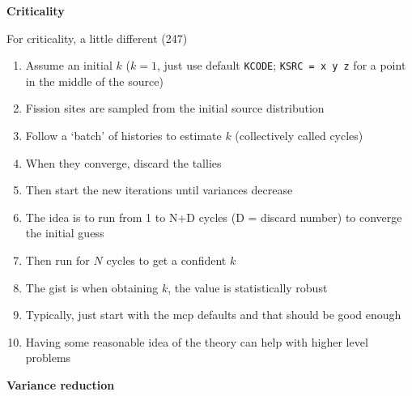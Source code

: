 \documentclass[aspectratio=1610,pdftex,dvipsnames,compress,xcolor={dvipsnames}]{beamer}
\newcommand{\acs}{\acrshort} %
\begin{document}
\begin{frame}[plain]{}
    \centering\LARGE\textbf{Criticality}
\end{frame}


\addtocounter{framenumber}{-1} 
\begin{frame}{For criticality, a little different (247)}
    \begin{enumerate}[series=outerlist,topsep=0pt,itemsep=5pt,leftmargin=*,label=(\arabic*)]
        \item[]Assume an initial $k$ ($k = 1$, just use default \texttt{KCODE}; \texttt{KSRC = x y z} for a point in the middle of the source)  
        \item[]Fission sites are sampled from the initial source distribution
        \item[]Follow a `batch' of histories to estimate $k$ (collectively called cycles)
        \item[]When they converge, discard the tallies
        \item[]Then start the new iterations until variances decrease
        \item[]The idea is to run from 1 to N+D cycles (D = discard number) to converge the initial guess
        \item[]Then run for $N$ cycles to get a confident $k$
        \item[]The gist is when obtaining $k$, the value is statistically robust
        \item[]Typically, just start with the \acs{mcp} defaults and that should be good enough
        \item[]Having some reasonable idea of the theory can help with higher level problems
    \end{enumerate}
\end{frame}


\begin{frame}[plain]{}
    \centering\LARGE\textbf{Variance reduction}
\end{frame}
\end{document}
